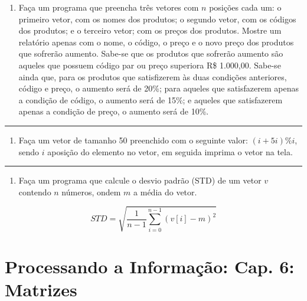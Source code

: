 \documentclass[12pt,a4paper]{article}
\providecommand{\tightlist}{%
      \setlength{\itemsep}{0pt}\setlength{\parskip}{0pt}}
\begin{document}
\begin{enumerate}
\def\labelenumi{\arabic{enumi}.}
\setcounter{enumi}{32}
\tightlist
\item
  Faça um programa que preencha três vetores com \(n\) posições cada um:
  o primeiro vetor, com os nomes dos produtos; o segundo vetor, com os
  códigos dos produtos; e o terceiro vetor; com os preços dos produtos.
  Mostre um relatório apenas com o nome, o código, o preço e o novo
  preço dos produtos que sofrerão aumento. Sabe-se que os produtos que
  sofrerão aumento são aqueles que possuem código par ou preço superiora
  R\$ 1.000,00. Sabe-se ainda que, para os produtos que satisfizerem às
  duas condições anteriores, código e preço, o aumento será de 20\%;
  para aqueles que satisfazerem apenas a condição de código, o aumento
  será de 15\%; e aqueles que satisfazerem apenas a condição de preço, o
  aumento será de 10\%.
\end{enumerate}

    \begin{center}\rule{0.5\linewidth}{0.5pt}\end{center}

\begin{enumerate}
\def\labelenumi{\arabic{enumi}.}
\setcounter{enumi}{33}
\tightlist
\item
  Faça um vetor de tamanho 50 preenchido com o seguinte valor:
  \((i+5i)\%i\), sendo \(i\) aposição do elemento no vetor, em seguida
  imprima o vetor na tela.
\end{enumerate}

    \begin{center}\rule{0.5\linewidth}{0.5pt}\end{center}

\begin{enumerate}
\def\labelenumi{\arabic{enumi}.}
\setcounter{enumi}{34}
\tightlist
\item
  Faça um programa que calcule o desvio padrão (STD) de um vetor \(v\)
  contendo \(n\) números, ondem \(m\) a média do vetor.
\end{enumerate}

\[ STD = \sqrt{\frac{1}{n-1} \sum_{i=0}^{n-1}(v[i]-m)^2} \]

    \hypertarget{processando-a-informauxe7uxe3o-cap.-6-matrizes}{%
\section{Processando a Informação: Cap. 6:
Matrizes}\label{processando-a-informauxe7uxe3o-cap.-6-matrizes}}
\end{document}
